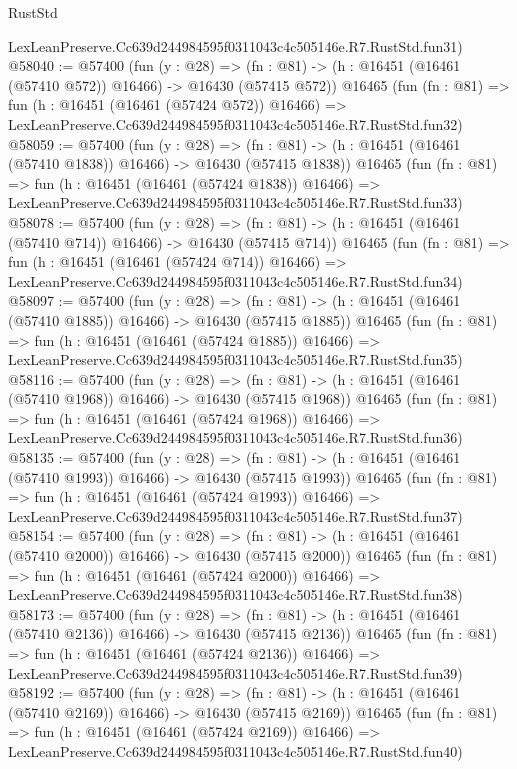 \begin{lexlean}{RustStd}
\begin{coremodule}
    LexLeanPreserve.Cc639d244984595f0311043c4c505146e.R7.RustStd.fun31)
@58040 := @57400
    (fun (y : @28) =>
    (fn : @81) -> (h : @16451 (@16461 (@57410 @572)) @16466) -> @16430 (@57415 @572))
    @16465
    (fun (fn : @81) =>
    fun (h : @16451 (@16461 (@57424 @572)) @16466) =>
    LexLeanPreserve.Cc639d244984595f0311043c4c505146e.R7.RustStd.fun32)
@58059 := @57400
    (fun (y : @28) =>
    (fn : @81) -> (h : @16451 (@16461 (@57410 @1838)) @16466) -> @16430 (@57415 @1838))
    @16465
    (fun (fn : @81) =>
    fun (h : @16451 (@16461 (@57424 @1838)) @16466) =>
    LexLeanPreserve.Cc639d244984595f0311043c4c505146e.R7.RustStd.fun33)
@58078 := @57400
    (fun (y : @28) =>
    (fn : @81) -> (h : @16451 (@16461 (@57410 @714)) @16466) -> @16430 (@57415 @714))
    @16465
    (fun (fn : @81) =>
    fun (h : @16451 (@16461 (@57424 @714)) @16466) =>
    LexLeanPreserve.Cc639d244984595f0311043c4c505146e.R7.RustStd.fun34)
@58097 := @57400
    (fun (y : @28) =>
    (fn : @81) -> (h : @16451 (@16461 (@57410 @1885)) @16466) -> @16430 (@57415 @1885))
    @16465
    (fun (fn : @81) =>
    fun (h : @16451 (@16461 (@57424 @1885)) @16466) =>
    LexLeanPreserve.Cc639d244984595f0311043c4c505146e.R7.RustStd.fun35)
@58116 := @57400
    (fun (y : @28) =>
    (fn : @81) -> (h : @16451 (@16461 (@57410 @1968)) @16466) -> @16430 (@57415 @1968))
    @16465
    (fun (fn : @81) =>
    fun (h : @16451 (@16461 (@57424 @1968)) @16466) =>
    LexLeanPreserve.Cc639d244984595f0311043c4c505146e.R7.RustStd.fun36)
@58135 := @57400
    (fun (y : @28) =>
    (fn : @81) -> (h : @16451 (@16461 (@57410 @1993)) @16466) -> @16430 (@57415 @1993))
    @16465
    (fun (fn : @81) =>
    fun (h : @16451 (@16461 (@57424 @1993)) @16466) =>
    LexLeanPreserve.Cc639d244984595f0311043c4c505146e.R7.RustStd.fun37)
@58154 := @57400
    (fun (y : @28) =>
    (fn : @81) -> (h : @16451 (@16461 (@57410 @2000)) @16466) -> @16430 (@57415 @2000))
    @16465
    (fun (fn : @81) =>
    fun (h : @16451 (@16461 (@57424 @2000)) @16466) =>
    LexLeanPreserve.Cc639d244984595f0311043c4c505146e.R7.RustStd.fun38)
@58173 := @57400
    (fun (y : @28) =>
    (fn : @81) -> (h : @16451 (@16461 (@57410 @2136)) @16466) -> @16430 (@57415 @2136))
    @16465
    (fun (fn : @81) =>
    fun (h : @16451 (@16461 (@57424 @2136)) @16466) =>
    LexLeanPreserve.Cc639d244984595f0311043c4c505146e.R7.RustStd.fun39)
@58192 := @57400
    (fun (y : @28) =>
    (fn : @81) -> (h : @16451 (@16461 (@57410 @2169)) @16466) -> @16430 (@57415 @2169))
    @16465
    (fun (fn : @81) =>
    fun (h : @16451 (@16461 (@57424 @2169)) @16466) =>
    LexLeanPreserve.Cc639d244984595f0311043c4c505146e.R7.RustStd.fun40)

\end{coremodule}
\end{lexlean}
